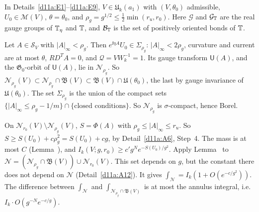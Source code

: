 In Details~\ref{d11a:E1}--\ref{d11a:E9}, $V\in\mathfrak U_k(a_1)$ with $(V,\theta_0)$ admissible, $U_0\in\mathscr M(V)$, $\theta=\theta_0$, and $\rho_g=g^{1/2}\le\frac12\min(r_u,r_0)$. Here $\mathcal G$ and $\mathcal G_\mathbb T$ are the real gauge groups of $\mathbb T_\eta$ and $\mathbb T$, and $\mathcal B_\mathbb T$ is the set of positively oriented bonds of $\mathbb T$.

\begin{detail}\label{d11a:E1}
\begin{step}
Let $A\in\mathcal S_V$ with $|A|_\infty<\rho_g$. Then $e^{\ii\eta A}U_0\in\Sigma_{\rho_g}$: $|A|_\infty<2\rho_g$, curvature and current are at most $\theta$, $RD^TA=0$, and $\mathcal Q=VW_k^{-1}=1$. Its gauge transform $\mathsf U(A)$, and the $\mathfrak G_0$-orbit of $\mathsf U(A)$, lie in $\mathscr N_{\rho_g}$. So $\mathscr N_{\rho_g}(V)\subset\mathscr N_{\rho_g}\cap\mathfrak B(V)\subset\mathfrak B(V)\cap\mathfrak U(\theta_0)$, the last by gauge invariance of $\mathfrak U(\theta_0)$. The set $\Sigma_{\rho_g}$ is the union of the compact sets $\{|A|_\infty\le\rho_g-1/m\}\cap\{\text{closed conditions}\}$. So $\mathscr N_{\rho_g}$ is $\sigma$-compact, hence Borel.
\end{step}
\begin{step}
On $\mathscr N_{r_0}(V)\setminus\mathscr N_{\rho_g}(V)$, $S=\Phi(A)$ with $\rho_g\le|A|_\infty\le r_u$. So $S\ge S(U_0)+c\rho_g^2=S(U_0)+cg$, by Detail~\ref{d11a:A6}, Step~4. The mass is at most $C$ (Lemma~), and $I_k(V;g,r_0)\ge c'g^Ne^{-S(U_0)/g^2}$. Apply Lemma~ to $\mathscr N=(\mathscr N_{\rho_g}\cap\mathfrak B(V))\cup\mathscr N_{r_0}(V)$. This set depends on $g$, but the constant there does not depend on $\mathscr N$ (Detail~\ref{d11a:A12}). It gives $\int_{\mathscr N}=I_k(1+O(e^{-c/g^2}))$. The difference between $\int_{\mathscr N}$ and $\int_{\mathscr N_{\rho_g}\cap\mathfrak B(V)}$ is at most the annulus integral, i.e.\ $I_k\cdot O(g^{-N}e^{-c/g})$.
\end{step}
\end{detail}

